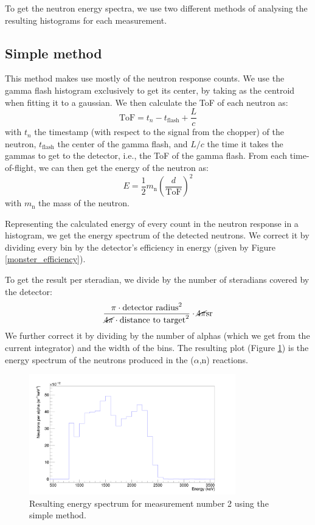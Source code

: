 \documentclass[a4paper,12pt]{report}
\newcommand{\an}{($\alpha$,n) }
\begin{document}
To get the neutron energy spectra, we use two different methods of analysing the resulting histograms for each measurement.

\subsection{Simple method}
This method makes use mostly of the neutron response counts.
We use the gamma flash histogram exclusively to get its center, by taking as the centroid when fitting it to a gaussian.
We then calculate the ToF of each neutron as:
\begin{equation}
	\text{ToF} = t_n-t_\text{flash}+\frac{L}{c}
\end{equation}
with $t_n$ the timestamp (with respect to the signal from the chopper) of the neutron, $t_\text{flash}$ the center of the gamma flash, and $L/c$ the time it takes the gammas to get to the detector, i.e., the ToF of the gamma flash.
From each time-of-flight, we can then get the energy of the neutron as:
\begin{equation}
	E=\frac{1}{2} m_\text{n} \left( \frac{d}{\text{ToF}} \right)^2
\end{equation}
with $m_\text{n}$ the mass of the neutron.

Representing the calculated energy of every count in the neutron response in a histogram, we get the energy spectrum of the detected neutrons.
We correct it by dividing every bin by the detector's efficiency in energy (given by Figure \ref{monster_efficiency}).

To get the result per steradian, we divide by the number of steradians covered by the detector:
\[ \frac{\pi \cdot \text{detector radius}^2}{\cancel{4 \pi} \cdot \text{distance to target}^2}\cdot \cancel{4\pi}\unit{sr}  \]
We further correct it by dividing by the number of alphas (which we get from the current integrator) and the width of the bins.
The resulting plot (Figure \ref{pulsed_energysimple}) is the energy spectrum of the neutrons produced in the \an reactions.

\begin{figure}[H]
	\centering
	\includegraphics[width=0.80\textwidth]{pulsed_energysimple.png}
	\caption{Resulting energy spectrum for measurement number 2 using the simple method.}
	\label{pulsed_energysimple}
\end{figure}
\end{document}
